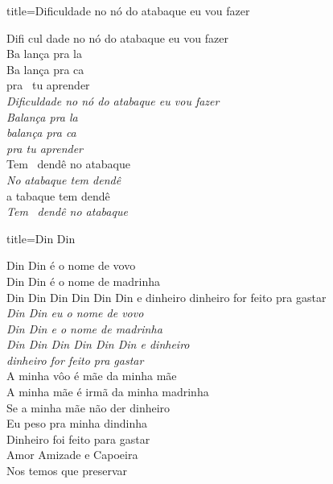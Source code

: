 \documentclass[fontsize=14pt, twoside]{scrreprt}
\begin{document}
\begin{multicols*}{2}
\columnbreak
\begin{song}{title={Dificuldade no nó do atabaque eu vou fazer}}
        \begin{verse*}
            Difi cul dade no nó do atabaque eu vou fazer\\
            Ba lança pra la\\
            Ba lança pra ca\\
            pra \ tu aprender\\
            \textit{Dificuldade no nó do atabaque eu vou fazer}\\
            \textit{Balança pra la}\\
            \textit{balança pra ca}\\
            \textit{pra tu aprender}\\
            Tem \ dendê no atabaque\\
            \textit{No} \textit{atabaque tem dendê}\\
            a tabaque tem dendê\\
            \textit{Tem} \ \textit{dendê no atabaque}\\
        \end{verse*}
\end{song}

\columnbreak
\begin{song}{title={Din Din}}
        \begin{verse*}
            Din Din é o nome de vovo\\
            Din Din é o nome de madrinha\\
            Din Din Din Din Din Din e dinheiro dinheiro for feito pra gastar\\
            \textit{Din Din eu o nome de vovo}\\
            \textit{Din Din e o nome de madrinha}\\
            \textit{Din Din Din Din Din Din e dinheiro}\\
            \textit{dinheiro for feito pra gastar}\\
            A minha vôo é mãe da minha mãe\\
            A minha mãe é irmã da minha madrinha\\
            Se a minha mãe não der dinheiro\\
            Eu peso pra minha dindinha\\
            Dinheiro foi feito para gastar\\
            Amor Amizade e Capoeira\\
            Nos temos que preservar\\
        \end{verse*}
\end{song}



\end{multicols*}
\end{document}
